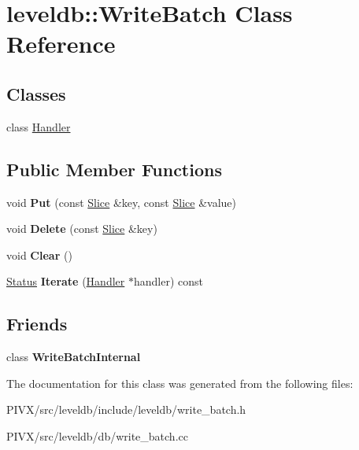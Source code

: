 \hypertarget{classleveldb_1_1_write_batch}{}\section{leveldb\+:\+:Write\+Batch Class Reference}
\label{classleveldb_1_1_write_batch}
\subsection*{Classes}
\begin{DoxyCompactItemize}
\item 
class \mbox{\hyperlink{classleveldb_1_1_write_batch_1_1_handler}{Handler}}
\end{DoxyCompactItemize}
\subsection*{Public Member Functions}
\begin{DoxyCompactItemize}
\item 
\mbox{\label{classleveldb_1_1_write_batch_a30770379143a7ccb4ede18ddf0e45bf3}} 
void {\bfseries Put} (const \mbox{\hyperlink{classleveldb_1_1_slice}{Slice}} \&key, const \mbox{\hyperlink{classleveldb_1_1_slice}{Slice}} \&value)
\item 
\mbox{\label{classleveldb_1_1_write_batch_a473da7f94483dab253cc36b7b231ce53}} 
void {\bfseries Delete} (const \mbox{\hyperlink{classleveldb_1_1_slice}{Slice}} \&key)
\item 
\mbox{\label{classleveldb_1_1_write_batch_afd5058344dc9be113919a5110129006f}} 
void {\bfseries Clear} ()
\item 
\mbox{\label{classleveldb_1_1_write_batch_a64278020155c37619bfe007840bb2d23}} 
\mbox{\hyperlink{classleveldb_1_1_status}{Status}} {\bfseries Iterate} (\mbox{\hyperlink{classleveldb_1_1_write_batch_1_1_handler}{Handler}} $\ast$handler) const
\end{DoxyCompactItemize}
\subsection*{Friends}
\begin{DoxyCompactItemize}
\item 
\mbox{\label{classleveldb_1_1_write_batch_a0c491f15816190f8235ccd1367d5ae5f}} 
class {\bfseries Write\+Batch\+Internal}
\end{DoxyCompactItemize}


The documentation for this class was generated from the following files\+:\begin{DoxyCompactItemize}
\item 
P\+I\+V\+X/src/leveldb/include/leveldb/write\+\_\+batch.\+h\item 
P\+I\+V\+X/src/leveldb/db/write\+\_\+batch.\+cc\end{DoxyCompactItemize}
